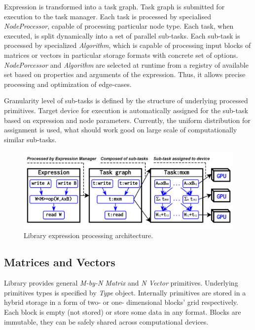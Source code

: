 Expression is transformed into a task graph. 
Task graph is submitted for execution to the task manager. 
Each task is processed by specialised \textit{NodeProcessor}, capable of processing particular node type.
Each task, when executed, is split dynamically into a set of parallel sub-tasks. 
Each sub-task is processed by specialized \textit{Algorithm}, which is capable of processing input blocks of matrices or vectors in particular storage formats with concrete set of options. \textit{NodePorcessor} and \textit{Algorithm} are selected at runtime from a registry of available set based on properties and arguments of the expression. 
Thus, it allows precise processing and optimization of edge-cases.

Granularity level of sub-tasks is defined by the structure of underlying processed primitives. 
Target device for execution is automatically assigned for the sub-task based on expression and node parameters. 
Currently, the uniform distribution for assignment is used, 
what should work good on large scale of computationally similar sub-tasks.

\begin{figure}[t]
\includegraphics[width=0.99\linewidth]{figures/library_architecture.png}
\caption{Library expression processing architecture.}
\label{fig:architecture}
\end{figure}
    
\subsection{Matrices and Vectors}

Library provides general \textit{M-by-N Matrix} and \textit{N Vector} primitives.
Underlying primitives types is specified by \textit{Type} object. 
Internally primitives are stored in a hybrid storage in a form of two- or one- dimensional blocks' grid respectively. 
Each block is empty (not stored) or store some data in any format. Blocks are immutable, they can be safely shared across computational devices.

